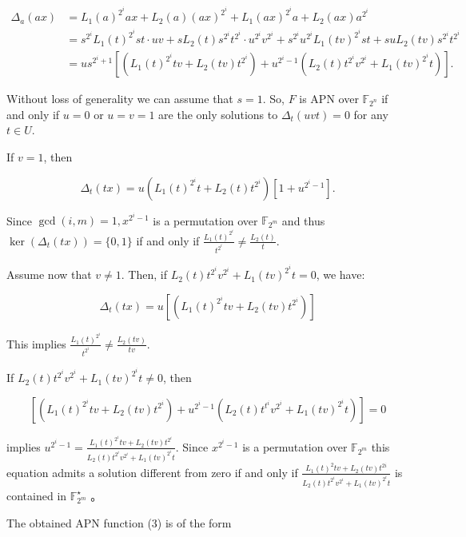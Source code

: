 \documentclass[10pt]{article}
\begin{document}
$$
\begin{aligned}
\Delta_{a}(a x) & =L_{1}(a)^{2^{i}} a x+L_{2}(a)(a x)^{2^{i}}+L_{1}(a x)^{2^{i}} a+L_{2}(a x) a^{2^{i}} \\
& =s^{2^{i}} L_{1}(t)^{2^{i}} s t \cdot u v+s L_{2}(t) s^{2^{i}} t^{2^{i}} \cdot u^{2^{i}} v^{2^{i}}+s^{2^{i}} u^{2^{i}} L_{1}(t v)^{2^{i}} s t+s u L_{2}(t v) s^{2^{i}} t^{2^{i}} \\
& =u s^{2^{i}+1}\left[\left(L_{1}(t)^{2^{i}} t v+L_{2}(t v) t^{2^{i}}\right)+u^{2^{i}-1}\left(L_{2}(t) t^{2^{i}} v^{2^{i}}+L_{1}(t v)^{2^{i}} t\right)\right] .
\end{aligned}
$$

Without loss of generality we can assume that $s=1$. So, $F$ is APN over $\mathbb{F}_{2^{n}}$ if and only if $u=0$ or $u=v=1$ are the only solutions to $\Delta_{t}(u v t)=0$ for any $t \in U$.

If $v=1$, then

$$
\Delta_{t}(t x)=u\left(L_{1}(t)^{2^{i}} t+L_{2}(t) t^{2^{i}}\right)\left[1+u^{2^{i}-1}\right] .
$$

Since $\operatorname{gcd}(i, m)=1, x^{2^{i}-1}$ is a permutation over $\mathbb{F}_{2^{m}}$ and thus $\operatorname{ker}\left(\Delta_{t}(t x)\right)=\{0,1\}$ if and only if $\frac{L_{1}(t)^{2^{i}}}{t^{2^{i}}} \neq \frac{L_{2}(t)}{t}$.

Assume now that $v \neq 1$. Then, if $L_{2}(t) t^{2^{i}} v^{2^{i}}+L_{1}(t v)^{2^{i}} t=0$, we have:

$$
\Delta_{t}(t x)=u\left[\left(L_{1}(t)^{2^{i}} t v+L_{2}(t v) t^{2^{i}}\right)\right]
$$

This implies $\frac{L_{1}(t)^{2^{i}}}{t^{2^{i}}} \neq \frac{L_{2}(t v)}{t v}$.

If $L_{2}(t) t^{2^{i}} v^{2^{i}}+L_{1}(t v)^{2^{i}} t \neq 0$, then

$$
\left[\left(L_{1}(t)^{2^{i}} t v+L_{2}(t v) t^{2^{i}}\right)+u^{2^{i}-1}\left(L_{2}(t) t^{t^{i}} v^{2^{i}}+L_{1}(t v)^{2^{i}} t\right)\right]=0
$$

implies $u^{2^{i}-1}=\frac{L_{1}(t)^{2^{i}} t v+L_{2}(t v) t^{2^{i}}}{L_{2}(t) t^{2^{i}} v^{2^{i}}+L_{1}(t v)^{2^{i}} t}$. Since $x^{2^{i}-1}$ is a permutation over $\mathbb{F}_{2^{m}}$ this equation admits a solution different from zero if and only if $\frac{L_{1}(t)^{2} t v+L_{2}(t v) t^{2 i}}{L_{2}(t) t^{2^{i}} v^{2^{i}}+L_{1}(t v)^{2^{i}} t}$ is contained in $\mathbb{F}_{2^{m}}^{\star}$ 。

The obtained APN function (3) is of the form
\end{document}
